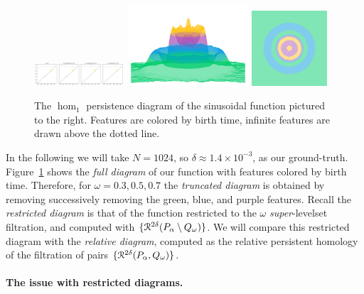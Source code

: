 \begin{figure}[htbp]\label{fig:ripple1}
  \centering
  \includegraphics[trim=0 0 790 0, clip, width=0.3\textwidth]{scripts/figures/matching2/full-dgm.png}
  \includegraphics[trim=-350 -800 -700 -300, clip, width=0.4\textwidth]{scripts/figures/matching2/full-surf_side-lowres.png}
  \includegraphics[trim=0 -800 0 0, width=0.25\textwidth]{scripts/figures/matching2/full-surf_top-lowres.png}
  \caption{The $\hom_1$ persistence diagram of the sinusoidal function pictured to the right.
  Features are colored by birth time, infinite features are drawn above the dotted line.}
\end{figure}

In the following we will take $N = 1024$, so $\delta\approx 1.4\times 10^{-3}$, as our ground-truth.
Figure~\ref{fig:ripple1} shows the \emph{full diagram} of our function with features colored by birth time.
Therefore, for $\omega = 0.3, 0.5, 0.7$ the \emph{truncated diagram} is obtained by removing successively removing the green, blue, and purple features.
Recall the \emph{restricted diagram} is that of the function restricted to the $\omega$ \emph{super}-levelset filtration, and computed with $\{\mathcal{R}^{2\delta}(P_\alpha\setminus Q_\omega)\}$.
We will compare this restricted diagram with the \emph{relative diagram}, computed as the relative persistent homology of the filtration of pairs $\{\mathcal{R}^{2\delta}(P_\alpha, Q_\omega)\}$.

\paragraph{The issue with restricted diagrams.}

